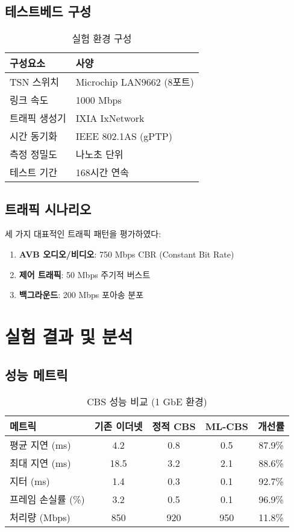 \documentclass[12pt, a4paper]{article}
\begin{document}
\subsection{테스트베드 구성}

\begin{table}[H]
\centering
\caption{실험 환경 구성}
\label{tab:testbed}
\begin{tabular}{ll}
\toprule
\textbf{구성요소} & \textbf{사양} \\
\midrule
TSN 스위치 & Microchip LAN9662 (8포트) \\
링크 속도 & 1000 Mbps \\
트래픽 생성기 & IXIA IxNetwork \\
시간 동기화 & IEEE 802.1AS (gPTP) \\
측정 정밀도 & 나노초 단위 \\
테스트 기간 & 168시간 연속 \\
\bottomrule
\end{tabular}
\end{table}

\subsection{트래픽 시나리오}

세 가지 대표적인 트래픽 패턴을 평가하였다:

\begin{enumerate}
    \item \textbf{AVB 오디오/비디오}: 750 Mbps CBR (Constant Bit Rate)
    \item \textbf{제어 트래픽}: 50 Mbps 주기적 버스트
    \item \textbf{백그라운드}: 200 Mbps 포아송 분포
\end{enumerate}

\section{실험 결과 및 분석}

\subsection{성능 메트릭}

\begin{table}[H]
\centering
\caption{CBS 성능 비교 (1 GbE 환경)}
\label{tab:performance}
\begin{tabular}{lcccc}
\toprule
\textbf{메트릭} & \textbf{기존 이더넷} & \textbf{정적 CBS} & \textbf{ML-CBS} & \textbf{개선률} \\
\midrule
평균 지연 (ms) & 4.2 & 0.8 & 0.5 & 87.9\% \\
최대 지연 (ms) & 18.5 & 3.2 & 2.1 & 88.6\% \\
지터 (ms) & 1.4 & 0.3 & 0.1 & 92.7\% \\
프레임 손실률 (\%) & 3.2 & 0.5 & 0.1 & 96.9\% \\
처리량 (Mbps) & 850 & 920 & 950 & 11.8\% \\
\bottomrule
\end{tabular}
\end{table}
\end{document}
